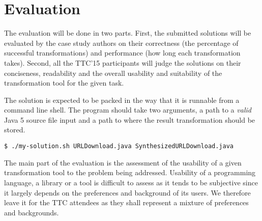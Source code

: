 
\section{Evaluation}
\label{sec:EvaluationCriteria}

The evaluation will be done in two parts.
First, the submitted solutions will be evaluated by the case study authors on their correctness (the percentage of successful transformations) and performance (how long each transformation takes).
Second, all the TTC'15 participants will judge the solutions on their conciseness, readability and the overall usability and suitability of the transformation tool for the given task.

The solution is expected to be packed in the way that it is runnable from a command line shell.
The program should take two arguments, a path to a \emph{valid} Java 5 source file input and a path to where the result transformation should be stored.
%
\begin{verbatim}
$ ./my-solution.sh URLDownload.java SynthesizedURLDownload.java
\end{verbatim}

The main part of the evaluation is the assessment of the usability of a given transformation tool to the problem being addressed.
Usability of a programming language, a library or a tool is difficult to assess as it tends to be subjective since it largely depends on the preferences and background of its users.
We therefore leave it for the TTC attendees as they shall represent a mixture of preferences and backgrounds.

